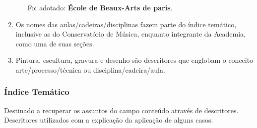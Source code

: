 \begin{enumerate}[label=(\alph*)]
\begin{itemize}
		Foi adotado: \textbf{École de Beaux-Arts de paris}.
	\end{itemize}

	\item Os nomes das aulas/cadeiras/disciplinas fazem parte do índice temático, inclusive as do Conservatório de Música, enquanto integrante da Academia, como uma de suas seções.
	
	\item Pintura, escultura, gravura e desenho são descritores que englobam o conceito arte/processo/técnica ou disciplina/cadeira/aula.
\end{enumerate}

\subsubsection{Índice Temático}

Destinado a recuperar os assuntos do campo conteúdo através de descritores. Descritores utilizados com a explicação da aplicação de alguns casos:

